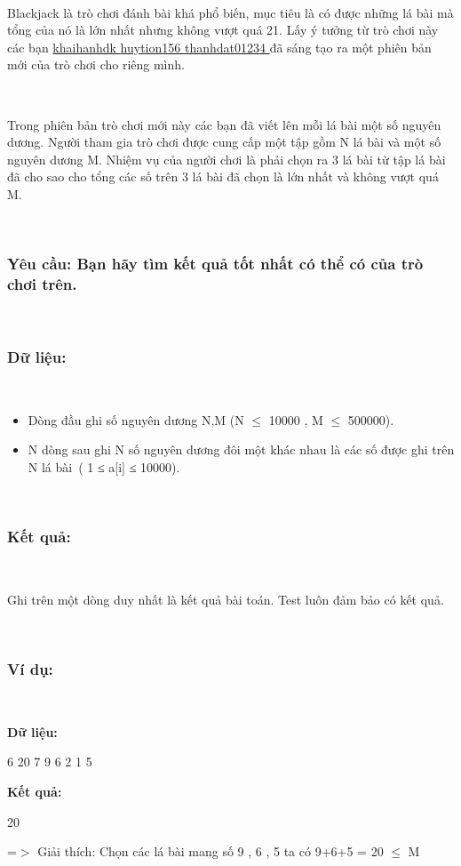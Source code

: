 

 

Blackjack là trò chơi đánh bài khá phổ biến, mục tiêu là có được những lá bài mà tổng của nó là lớn nhất nhưng không vượt quá 21. Lấy ý tưởng từ trò chơi này các bạn \href{http://vnoi.info/index.php?option=com_voj2&amp;page=user&amp;user=khaihanhdk}{ khaihanhdk }\href{http://vnoi.info/index.php?option=com_voj2&amp;page=user&amp;user=huytion156}{ huytion156 }\href{http://vnoi.info/index.php?option=com_voj2&amp;page=user&amp;user=thanhdat01234}{ thanhdat01234 } đã sáng tạo ra một phiên bản mới của trò chơi cho riêng mình.

 

Trong phiên bản trò chơi mới này các bạn đã viết lên mỗi lá bài một số nguyên dương. Người tham gia trò chơi được cung cấp một tập gồm N lá bài và một số nguyên dương M. Nhiệm vụ của người chơi là phải chọn ra 3 lá bài từ tập lá bài đã cho sao cho tổng các số trên 3 lá bài đã chọn là lớn nhất và không vượt quá M.

 

\subsubsection{Yêu cầu: Bạn hãy tìm kết quả tốt nhất có thể có của trò chơi trên.}

 

\subsubsection{Dữ liệu:}

 
\begin{itemize}
	\item Dòng đầu ghi số nguyên dương N,M (N $\le$ 10000 , M $\le$ 500000).
	\item N dòng sau ghi N số nguyên dương đôi một khác nhau là các số được ghi trên N lá bài ( 1 ≤ a[i] ≤ 10000).
\end{itemize}

 

\subsubsection{Kết quả:}

 

Ghi trên một dòng duy nhất là kết quả bài toán. Test luôn đảm bảo có kết quả.

 

\subsubsection{Ví dụ:}

 

\textbf{Dữ liệu: }

6 20 7 9 6 2 1 5

\textbf{Kết quả: }

20

=$>$ Giải thích: Chọn các lá bài mang số 9 , 6 , 5 ta có 9+6+5 = 20  $\le$  M

